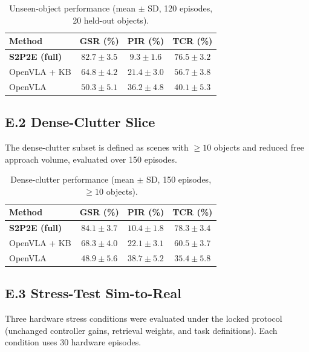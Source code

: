 \documentclass[11pt]{article}
\begin{document}
\begin{table}[htbp]
\centering
\caption{Unseen-object performance (mean $\pm$ SD, 120 episodes, 20 held-out objects).}
\label{tab:unseen_object}
\small\setlength{\tabcolsep}{4pt}
\begin{tabular}{@{}l c c c@{}}
\toprule
Method & GSR (\%) & PIR (\%) & TCR (\%) \\
\midrule
\textbf{S2P2E (full)} & $\mathbf{82.7 \pm 3.5}$ & $9.3 \pm 1.6$ & $76.5 \pm 3.2$ \\
OpenVLA + KB & $64.8 \pm 4.2$ & $21.4 \pm 3.0$ & $56.7 \pm 3.8$ \\
OpenVLA & $50.3 \pm 5.1$ & $36.2 \pm 4.8$ & $40.1 \pm 5.3$ \\
\bottomrule
\end{tabular}
\end{table}

\subsection{E.2 Dense-Clutter Slice}

The dense-clutter subset is defined as scenes with $\geq10$ objects and reduced free approach volume, evaluated over 150 episodes.

\begin{table}[htbp]
\centering
\caption{Dense-clutter performance (mean $\pm$ SD, 150 episodes, $\geq10$ objects).}
\label{tab:dense_clutter}
\small\setlength{\tabcolsep}{4pt}
\begin{tabular}{@{}l c c c@{}}
\toprule
Method & GSR (\%) & PIR (\%) & TCR (\%) \\
\midrule
\textbf{S2P2E (full)} & $\mathbf{84.1 \pm 3.7}$ & $10.4 \pm 1.8$ & $78.3 \pm 3.4$ \\
OpenVLA + KB & $68.3 \pm 4.0$ & $22.1 \pm 3.1$ & $60.5 \pm 3.7$ \\
OpenVLA & $48.9 \pm 5.6$ & $38.7 \pm 5.2$ & $35.4 \pm 5.8$ \\
\bottomrule
\end{tabular}
\end{table}

\subsection{E.3 Stress-Test Sim-to-Real}

Three hardware stress conditions were evaluated under the locked protocol (unchanged controller gains, retrieval weights, and task definitions). Each condition uses 30 hardware episodes.
\end{document}
